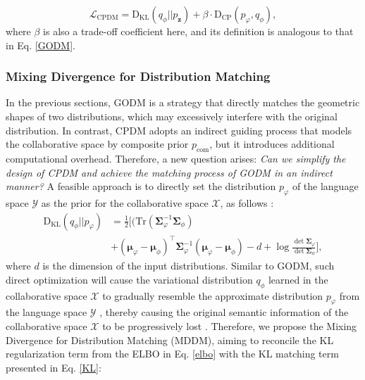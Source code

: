\documentclass[sigconf]{acmart}
\begin{document}
\begin{equation}
\label{CPDM}
\mathcal L_{\text{CPDM}}=\text{D}_{\text{KL}}(q_\phi||p_{\mathbf z}) + \beta \cdot \text{D}_{\text{CP}}(p_\varphi, q_\phi),
\end{equation}
where $\beta$ is also a trade-off coefficient here, and its definition is analogous to that in Eq. \ref{GODM}.

\subsubsection{\textbf{Mixing Divergence for Distribution Matching}}
In the previous sections, GODM is a strategy that directly matches the geometric shapes of two distributions, which may excessively interfere with the original distribution. In contrast, CPDM adopts an indirect guiding process that models the collaborative space by composite prior $p_{\text{com}}$, but it introduces additional computational overhead.
 Therefore, a new question arises: \textit{Can we simplify the design of CPDM and achieve the matching process of GODM in an indirect manner?} A feasible approach is to directly set the distribution $p_\varphi$ of the language space $\mathcal Y$ as the prior for the collaborative space $\mathcal X$, as follows \cite{kingma2013auto, zhang2024dual}:
\begin{equation}
\begin{aligned}
\label{KL}
\text{D}_{\text{KL}}(q_\phi||p_{\varphi})&=\frac{1}{2} [( \text{Tr}\left( \boldsymbol\Sigma_\varphi^{-1} \boldsymbol\Sigma_\phi \right) \\ &+ (\boldsymbol\mu_\varphi - \boldsymbol\mu_\phi)^\top \boldsymbol\Sigma_\varphi^{-1} (\boldsymbol\mu_\varphi - \boldsymbol\mu_\phi) - d + \log \frac{\det \boldsymbol\Sigma_\varphi}{\det \boldsymbol\Sigma_\phi} ],
\end{aligned}
\end{equation}
where $d$ is the dimension of the input distributions. Similar to GODM, such direct optimization will cause the variational distribution $q_\phi$ learned in the collaborative space $\mathcal X$ to gradually resemble the approximate distribution $p_\varphi$ from the language space $\mathcal Y$ \cite{salah2021towards}, thereby causing the original semantic information of the collaborative space $\mathcal X$ to be progressively lost \cite{chen2024hate}. Therefore, we propose the Mixing Divergence for Distribution Matching (MDDM), aiming to reconcile the KL regularization term from the ELBO in Eq. \ref{elbo} with the KL matching term presented in Eq. \ref{KL}:
\end{document}
